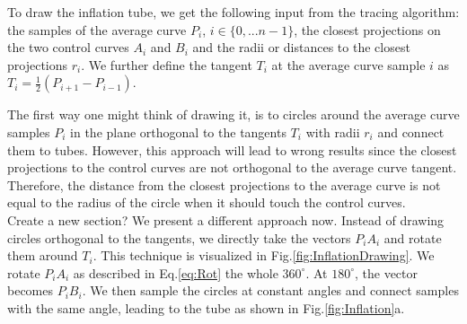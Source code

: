 \documentclass[journal, letterpaper]{IEEEtran}
\newcommand{\cre}{\color{red}}
\newcommand{\cbl}{\color{black}}
\begin{document}
To draw the inflation tube, we get the following input from the tracing algorithm: the samples of the average curve $P_i$, $i\in\{0,...n-1\}$, the closest projections on the two control curves $A_i$ and $B_i$ and the radii or distances to the closest projections $r_i$. We further define the tangent $T_i$ at the average curve sample $i$ as $T_i=\frac{1}{2}(P_{i+1}-P_{i-1})$.

The first way one might think of drawing it, is to circles around the average curve samples $P_i$ in the plane orthogonal to the tangents $T_i$ with radii $r_i$ and connect them to tubes. However, this approach will lead to wrong results since the closest projections to the control curves are not orthogonal to the average curve tangent. Therefore, the distance from the closest projections to the average curve is not equal to the radius of the circle when it should touch the control curves.\\

\cre Create a new section? \cbl We present a different approach now. Instead of drawing circles orthogonal to the tangents, we directly take the vectors $P_i A_i$ and rotate them around $T_i$. This technique is visualized in Fig.\ref{fig:InflationDrawing}. We rotate $P_i A_i$ as described in Eq.\ref{eq:Rot} the whole $360^{\circ}$. At $180^{\circ}$, the vector becomes $P_i B_i$. We then sample the circles at constant angles and connect samples with the same angle, leading to the tube as shown in Fig.\ref{fig:Inflation}a.
\end{document}

